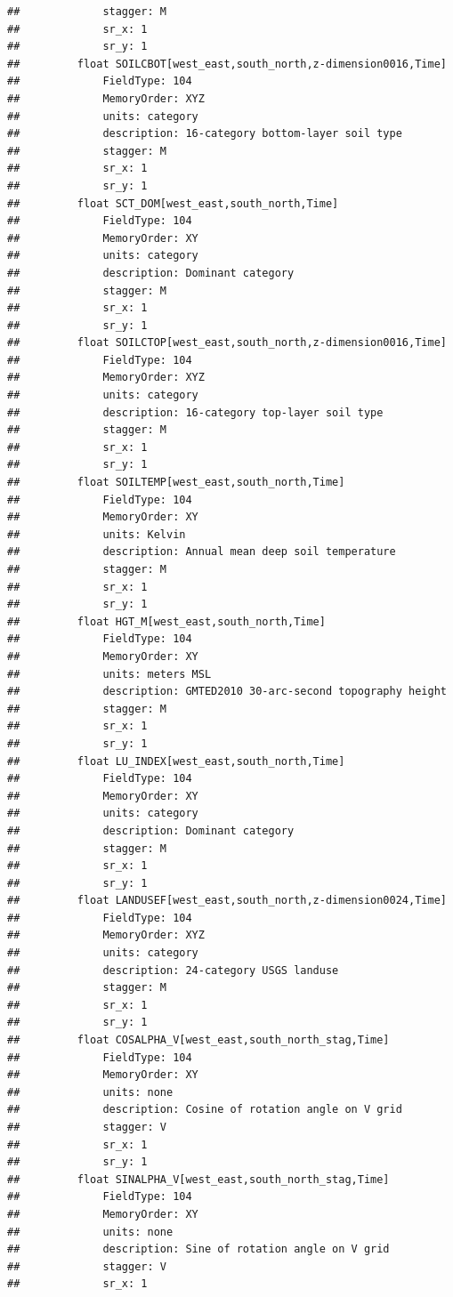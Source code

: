 \documentclass[]{book}
\theoremstyle{definition}
\theoremstyle{definition}
\theoremstyle{definition}
\theoremstyle{remark}
\begin{document}
\begin{verbatim}
##             stagger: M
##             sr_x: 1
##             sr_y: 1
##         float SOILCBOT[west_east,south_north,z-dimension0016,Time]   
##             FieldType: 104
##             MemoryOrder: XYZ
##             units: category
##             description: 16-category bottom-layer soil type
##             stagger: M
##             sr_x: 1
##             sr_y: 1
##         float SCT_DOM[west_east,south_north,Time]   
##             FieldType: 104
##             MemoryOrder: XY 
##             units: category
##             description: Dominant category
##             stagger: M
##             sr_x: 1
##             sr_y: 1
##         float SOILCTOP[west_east,south_north,z-dimension0016,Time]   
##             FieldType: 104
##             MemoryOrder: XYZ
##             units: category
##             description: 16-category top-layer soil type
##             stagger: M
##             sr_x: 1
##             sr_y: 1
##         float SOILTEMP[west_east,south_north,Time]   
##             FieldType: 104
##             MemoryOrder: XY 
##             units: Kelvin
##             description: Annual mean deep soil temperature
##             stagger: M
##             sr_x: 1
##             sr_y: 1
##         float HGT_M[west_east,south_north,Time]   
##             FieldType: 104
##             MemoryOrder: XY 
##             units: meters MSL
##             description: GMTED2010 30-arc-second topography height
##             stagger: M
##             sr_x: 1
##             sr_y: 1
##         float LU_INDEX[west_east,south_north,Time]   
##             FieldType: 104
##             MemoryOrder: XY 
##             units: category
##             description: Dominant category
##             stagger: M
##             sr_x: 1
##             sr_y: 1
##         float LANDUSEF[west_east,south_north,z-dimension0024,Time]   
##             FieldType: 104
##             MemoryOrder: XYZ
##             units: category
##             description: 24-category USGS landuse
##             stagger: M
##             sr_x: 1
##             sr_y: 1
##         float COSALPHA_V[west_east,south_north_stag,Time]   
##             FieldType: 104
##             MemoryOrder: XY 
##             units: none
##             description: Cosine of rotation angle on V grid
##             stagger: V
##             sr_x: 1
##             sr_y: 1
##         float SINALPHA_V[west_east,south_north_stag,Time]   
##             FieldType: 104
##             MemoryOrder: XY 
##             units: none
##             description: Sine of rotation angle on V grid
##             stagger: V
##             sr_x: 1

\end{verbatim}
\end{document}
